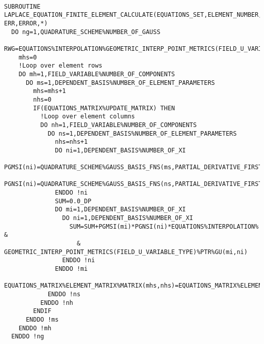 {\footnotesize\tt
\begin{lstlisting}
SUBROUTINE LAPLACE_EQUATION_FINITE_ELEMENT_CALCULATE(EQUATIONS_SET,ELEMENT_NUMBER, ERR,ERROR,*)
  DO ng=1,QUADRATURE_SCHEME%NUMBER_OF_GAUSS
    RWG=EQUATIONS%INTERPOLATION%GEOMETRIC_INTERP_POINT_METRICS(FIELD_U_VARIABLE_TYPE)%PTR%JACOBIAN*QUADRATURE_SCHEME%GAUSS_WEIGHTS(ng)
    mhs=0          
    !Loop over element rows
    DO mh=1,FIELD_VARIABLE%NUMBER_OF_COMPONENTS
      DO ms=1,DEPENDENT_BASIS%NUMBER_OF_ELEMENT_PARAMETERS
        mhs=mhs+1
        nhs=0
        IF(EQUATIONS_MATRIX%UPDATE_MATRIX) THEN
          !Loop over element columns
          DO nh=1,FIELD_VARIABLE%NUMBER_OF_COMPONENTS
            DO ns=1,DEPENDENT_BASIS%NUMBER_OF_ELEMENT_PARAMETERS
              nhs=nhs+1
              DO ni=1,DEPENDENT_BASIS%NUMBER_OF_XI
                PGMSI(ni)=QUADRATURE_SCHEME%GAUSS_BASIS_FNS(ms,PARTIAL_DERIVATIVE_FIRST_DERIVATIVE_MAP(ni),ng)
                PGNSI(ni)=QUADRATURE_SCHEME%GAUSS_BASIS_FNS(ns,PARTIAL_DERIVATIVE_FIRST_DERIVATIVE_MAP(ni),ng)
              ENDDO !ni
              SUM=0.0_DP
              DO mi=1,DEPENDENT_BASIS%NUMBER_OF_XI
                DO ni=1,DEPENDENT_BASIS%NUMBER_OF_XI
                  SUM=SUM+PGMSI(mi)*PGNSI(ni)*EQUATIONS%INTERPOLATION% &
                    & GEOMETRIC_INTERP_POINT_METRICS(FIELD_U_VARIABLE_TYPE)%PTR%GU(mi,ni)
                ENDDO !ni
              ENDDO !mi
              EQUATIONS_MATRIX%ELEMENT_MATRIX%MATRIX(mhs,nhs)=EQUATIONS_MATRIX%ELEMENT_MATRIX%MATRIX(mhs,nhs)+SUM*RWG
            ENDDO !ns
          ENDDO !nh
        ENDIF
      ENDDO !ms
    ENDDO !mh
  ENDDO !ng
\end{lstlisting}
}



